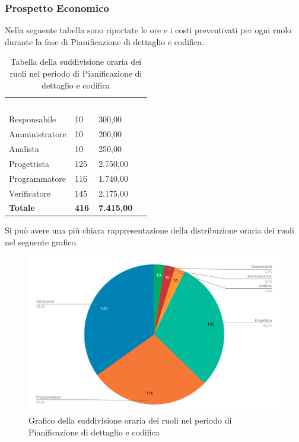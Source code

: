 \subsubsection{Prospetto Economico}
Nella seguente tabella sono riportate le ore e i costi preventivati per ogni ruolo durante la fase di Pianificazione di dettaglio e codifica.


\begin{table}[H]	
	\begin{center}
	    \begin{tabular}{C{4cm}C{1cm}C{3,5cm}}
			\textcolor{white}{\textbf{Ruolo}} & \textcolor{white}{\textbf{Ore}} & \textcolor{white}{\textbf{Costo in €}}
			\\ 
			Responsabile & 10 & 300,00 \\
			Amministratore & 10 & 200,00 \\
			Analista & 10 & 250,00 \\
			Progettista & 125 & 2.750,00 \\
			Programmatore & 116 & 1.740,00 \\
			Verificatore & 145 & 2.175,00 \\
			\textbf{Totale} & \textbf{416} & \textbf{7.415,00} \\
		\end{tabular}
	    \caption{Tabella della suddivisione oraria dei ruoli nel periodo di Pianificazione di dettaglio e codifica} \label{tab:tabellaRuoliPianificazione di dettaglio e codifica} 
	\end{center}
\end{table}


Si può avere una più chiara rappresentazione della distribuzione oraria dei ruoli nel seguente grafico.

\begin{figure}[H]
\centering
	\includegraphics[width=1\linewidth]{Preventivo/grafici/PC2_1.pdf}
	\caption{Grafico della suddivisione oraria dei ruoli nel periodo di Pianificazione di dettaglio e codifica}
\end{figure}

